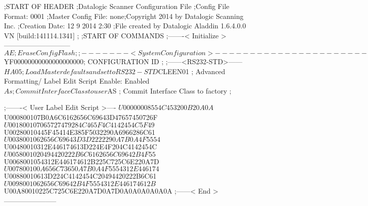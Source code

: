 ;START OF HEADER
;Datalogic Scanner Configuration File
;Config File Format: 0001
;Master Config File: none;Copyright 2014 by Datalogic Scanning Inc.
;Creation Date: 12 9 2014 2:30
;File created by Datalogic Aladdin 1.6.4.0.0 VN [build:141114.1341]
;
;START OF COMMANDS
;-------< Initialize >-----------------------------
$AE                 ; Erase Config Flash
;
;-------< System Configuration >-------------------------------
$YF00000000000000000000; CONFIGURATION ID
;
;------<RS232-STD>------
$HA05               ; Load Master defaults and set to RS232-STD
$CLEEN01            ; Advanced Formatting/ Label Edit Script Enable: Enabled
$As                 ; Commit Interface Class to user
$AS                 ; Commit Interface Class to factory
;

;-------< User Label Edit Script >----
$U00000008554C453200B20A0A
$U000800107B0A6C6162656C69643D47657450726F
$U001800107065727479284C465F4C4142454C5F49
$U00280010445F45414E385F5032290A6966286C61
$U0038001062656C69643D3D2222290A7B0A4F5554
$U00480010312E446174613D224E4F204C4142454C
$U0058001020494420222B6C6162656C69642B4F55
$U0068001054312E446174612B225C725C6E220A7D
$U007800100A656C73650A7B0A4F5554312E446174
$U00880010613D224C4142454C20494420222B6C61
$U0098001062656C69642B4F5554312E446174612B
$U00A80010225C725C6E220A7D0A7D0A0A0A0A0A0A
;------< End >-----------------------

